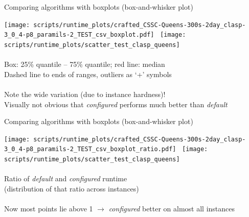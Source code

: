 \begin{frame}[c]{Comparing algorithms with boxplots (box-and-whisker plot)}

\vspace*{-0.5cm}
\begin{center}
\texttt{[image: scripts/runtime\_plots/crafted\_CSSC-Queens-300s-2day\_clasp-3\_0\_4-p8\_paramils-2\_TEST\_csv\_boxplot.pdf]}~
\texttt{[image: scripts/runtime\_plots/scatter\_test\_clasp\_queens]}\\~\\
\vspace*{-0.3cm}
Box: 25\% quantile -- 75\% quantile; red line: median\\
Dashed line to ends of ranges, outliers as `+' symbols\\~\\
\pause
Note the wide variation (due to instance hardness)!\\
Visually not obvious that \emph{configured} performs much better than
\emph{default}
\end{center}

\end{frame}


\begin{frame}[c]{Comparing algorithms with boxplots (box-and-whisker plot)}

\vspace*{-0.5cm}
\begin{center}
\texttt{[image: scripts/runtime\_plots/crafted\_CSSC-Queens-300s-2day\_clasp-3\_0\_4-p8\_paramils-2\_TEST\_csv\_boxplot\_ratio.pdf]}~
\texttt{[image: scripts/runtime\_plots/scatter\_test\_clasp\_queens]}\\~\\
\vspace*{-0.3cm}
\alert{Ratio} of \emph{default} and \emph{configured} runtime\\ (distribution of that ratio across instances) \pause\\~\\
Now most points lie above 1 $\rightarrow$ \emph{configured} better on almost all instances 
\end{center}

\end{frame}



